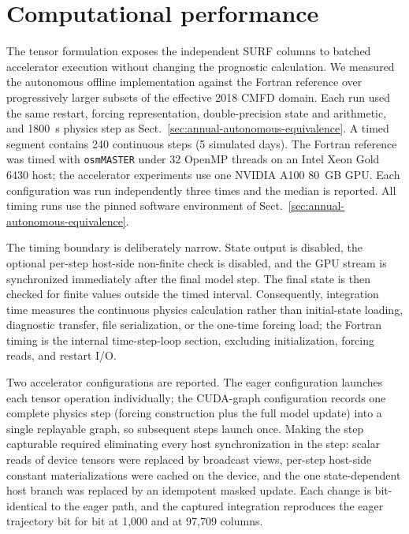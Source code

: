 \section{Computational performance}
\label{sec:performance}

The tensor formulation exposes the independent SURF columns to batched
accelerator execution without changing the prognostic calculation. We
measured the autonomous offline implementation against the Fortran reference
over progressively larger subsets of the effective 2018 CMFD domain. Each run
used the same restart, forcing representation, double-precision state and
arithmetic, and 1800~s physics step as
Sect.~\ref{sec:annual-autonomous-equivalence}. A timed segment contains 240
continuous steps (5 simulated days). The Fortran reference was timed with
\texttt{osmMASTER} under 32 OpenMP threads on an Intel Xeon Gold 6430 host;
the accelerator experiments use one NVIDIA A100 80~GB GPU. Each configuration
was run independently three times and the median is reported. All timing runs
use the pinned software environment of
Sect.~\ref{sec:annual-autonomous-equivalence}.

The timing boundary is deliberately narrow. State output is disabled, the
optional per-step host-side non-finite check is disabled, and the GPU stream
is synchronized immediately after the final model step. The final state is
then checked for finite values outside the timed interval. Consequently,
integration time measures the continuous physics calculation rather than
initial-state loading, diagnostic transfer, file serialization, or the
one-time forcing load; the Fortran timing is the internal time-step-loop
section, excluding initialization, forcing reads, and restart I/O.

Two accelerator configurations are reported. The eager configuration launches
each tensor operation individually; the CUDA-graph configuration records one
complete physics step (forcing construction plus the full model update) into
a single replayable graph, so subsequent steps launch once. Making the step
capturable required eliminating every host synchronization in the step: scalar
reads of device tensors were replaced by broadcast views, per-step host-side
constant materializations were cached on the device, and the one
state-dependent host branch was replaced by an idempotent masked update. Each
change is bit-identical to the eager path, and the captured integration
reproduces the eager trajectory bit for bit at 1,000 and at 97,709 columns.

